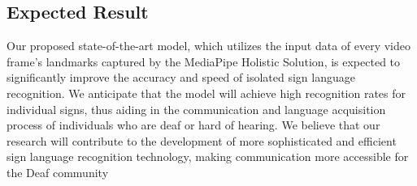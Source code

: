 \documentclass[10pt,twocolumn,letterpaper]{article}
\begin{document}
\begin{CJK*}{UTF8}{bsmi}
\section{Expected Result}
Our proposed state-of-the-art model, which utilizes the input data of every video frame's landmarks captured by the MediaPipe Holistic Solution, 
is expected to significantly improve the accuracy and speed of isolated sign language recognition. 
We anticipate that the model will achieve high recognition rates for individual signs, 
thus aiding in the communication and language acquisition process of individuals who are deaf or hard of hearing. 
We believe that our research will contribute to the development of more sophisticated and efficient sign language recognition technology, 
making communication more accessible for the Deaf community


{\small


}

\end{CJK*}
\end{document}
